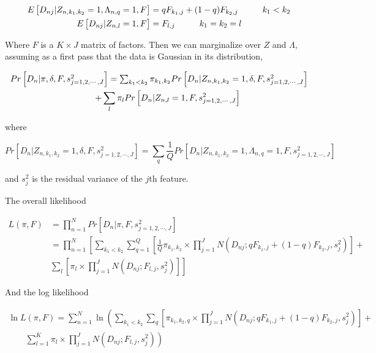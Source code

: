 \documentclass[11pt,authoryear]{article}
\begin{document}
\begin{align}
 E \left [ D_{nj} | Z_{n, k_1, k_2} = 1, \Lambda_{n,q}=1, F \right] &= q
  F_{k_1,j} + (1-q) F_{k_2,j} \hspace{1 cm} k_1<k_2 \nonumber \\
 E \left [ D_{nj} | Z_{n,l} = 1, F \right] &= F_{l,j} \hspace{1 cm} k_1 = k_2 = l 
\end{align}

Where $F$ is a $K\times J$ matrix of factors. 
Then we can marginalize over $Z$ and $\Lambda$, assuming as a first pass 
that the data is Gaussian in its distribution,

\begin{multline}
 $$ Pr \left [ D_{n} | \pi, \delta, F, s^2_{j=1,2,\cdots,J} \right ] = \sum_{k_1 < k_2}
 \pi_{k_1, k_2} Pr \left [ D_{n} | Z_{n, k_1, k_2}=1, \delta, F, s^2_{j=1,2,\cdots,J} \right ]  \\
   \qquad +  \sum_{l} \pi_{l} Pr \left [ D_{n} | Z_{n, l}=1,  F, s^2_{j=1,2,\cdots,J} \right ]$$
 \end{multline}

where 

$$ Pr \left [ D_{n} | Z_{n, k_1, k_2}=1, \delta, F, s^2_{j=1,2,\cdots,J} \right ] = \sum_{q} \frac{1}{Q} Pr \left [D_{n} | Z_{n, k_1, k_2}=1, \Lambda_{n, q}=1, F, s^2_{j=1,2,\cdots,J} \right ] $$

and $s^2_{j}$ is the residual variance of the $j$th feature.
 
The overall likelihood 

\begin{align}
L(\pi, F) &= \prod_{n=1}^{N} Pr \left [ D_{n} | \pi, F, s^2_{j=1,2,\cdots,J}
\right ] \nonumber \\
 &= \prod_{n=1}^{N} \left [ \sum_{k_1 < k_2} \sum_{q=1}^{Q} \left [ \frac{1}{Q}\pi_{k_1,k_2} \times \prod_{j=1}^{J} N \left (D_{nj}; q F_{k_1,j} + (1-q) F_{k_2, j}, s^2_{j} \right) \right ] + \right.\nonumber \\
 & \left. \sum_{l} \left [ \pi_{l} \times \prod_{j=1}^{J} N \left (D_{nj}; F_{l,j} , s^2_{j} \right) \right ] \right]
\end{align}

And the log likelihood

\begin{multline}
\ln {L (\pi, F)} = \sum_{n=1}^{N} \ln \left (\sum_{k_1 < k_2} \sum_{q} \left [ \pi_{k_1,k_2, q} \times \prod_{j=1}^{J} N \left (D_{nj}; q F_{k_1,j} + (1-q) F_{k_2, j}, s^2_{j} \right) \right ] + \right . \\
\left. \qquad \sum_{l=1}^{K} \pi_{l}  \times \prod_{j=1}^{J} N \left (D_{nj}; F_{l,j}, s^2_{j} \right)\right )
\end{multline}
\end{document}
